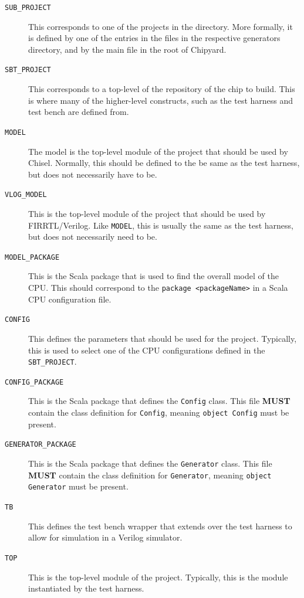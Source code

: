 \begin{description}
\item[\texttt{SUB\_PROJECT}] This corresponds to one of the projects in the  directory.
  More formally, it is defined by one of the entries in the  files in the respective generators directory, and by the main  file in the root of Chipyard.
\item[\texttt{SBT\_PROJECT}] This corresponds to a top-level of the repository of the chip to build.
  This is where many of the higher-level constructs, such as the test harness and test bench are defined from.
\item[\texttt{MODEL}] The model is the top-level module of the project that should be used by Chisel.
  Normally, this should be defined to the be same as the test harness, but does not necessarily have to be.
\item[\texttt{VLOG\_MODEL}] This is the top-level module of the project that should be used by FIRRTL/Verilog.
  Like \texttt{MODEL}, this is usually the same as the test harness, but does not necessarily need to be.
\item[\texttt{MODEL\_PACKAGE}] This is the Scala package that is used to find the overall model of the CPU.\@
  This should correspond to the \texttt{package <packageName>} in a Scala CPU configuration file.
\item[\texttt{CONFIG}] This defines the parameters that should be used for the project.
  Typically, this is used to select one of the CPU configurations defined in the \texttt{SBT\_PROJECT}.
\item[\texttt{CONFIG\_PACKAGE}] This is the Scala package that defines the \texttt{Config} class.
  This file \textbf{MUST} contain the class definition for \texttt{Config}, meaning \texttt{object Config} must be present.
\item[\texttt{GENERATOR\_PACKAGE}] This is the Scala package that defines the \texttt{Generator} class.
  This file \textbf{MUST} contain the class definition for \texttt{Generator}, meaning \texttt{object Generator} must be present.
\item[\texttt{TB}] This defines the test bench wrapper that extends over the test harness to allow for simulation in a Verilog simulator.
\item[\texttt{TOP}] This is the top-level module of the project.
  Typically, this is the module instantiated by the test harness.
\end{description}

